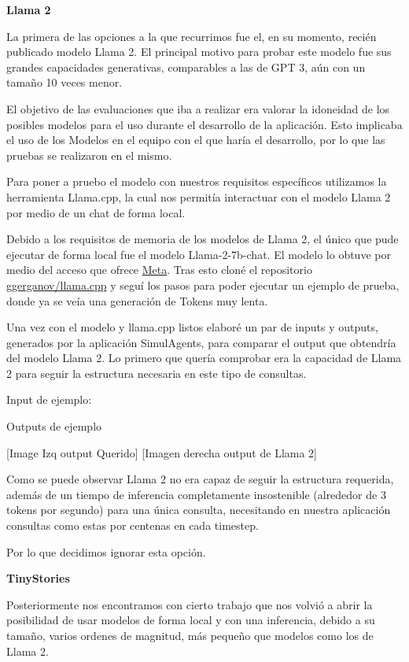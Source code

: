 \textbf{Llama 2}

La primera de las opciones a la que recurrimos fue el, en su momento, recién publicado modelo Llama 2. El principal motivo para probar este modelo fue sus grandes capacidades generativas, comparables a las de GPT 3, aún con un tamaño 10 veces menor.

El  objetivo de las evaluaciones que iba a realizar era valorar la idoneidad de los posibles modelos para el uso durante el desarrollo  de la aplicación. Esto implicaba el uso de los Modelos en el equipo con el que haría el desarrollo, por lo que las pruebas se realizaron en el mismo.

Para poner a pruebo el modelo con nuestros requisitos específicos utilizamos la herramienta Llama.cpp, la cual nos permitía interactuar con el modelo Llama 2 por medio de un chat de forma local.

Debido a los requisitos de memoria de los modelos de Llama 2, el único que pude ejecutar de forma local fue el modelo Llama-2-7b-chat. El modelo lo obtuve por medio del acceso que ofrece \href{https://llama.meta.com/llama-downloads/}{Meta}. Tras esto cloné el repositorio \href{https://github.com/ggerganov/llama.cpp}{ggerganov/llama.cpp} y seguí los pasos para poder ejecutar un ejemplo de prueba, donde ya se veía una generación de Tokens muy lenta.

Una vez con el modelo y llama.cpp listos elaboré un par de inputs y outputs, generados por la aplicación SimulAgents, para comparar el output que obtendría del modelo Llama 2. Lo primero que quería comprobar era la capacidad de Llama 2 para seguir la estructura necesaria en este tipo de consultas.

Input de ejemplo:

Outputs de ejemplo

[Image Izq output Querido] [Imagen derecha output de Llama 2]

Como se puede observar Llama 2 no era capaz de seguir la estructura requerida, además de un tiempo de inferencia completamente insostenible (alrededor de 3 tokens por segundo) para una única consulta, necesitando en nuestra aplicación consultas como estas por centenas en cada timestep.

Por lo que decidimos ignorar esta opción.

\textbf{TinyStories}

Posteriormente nos encontramos con cierto trabajo que nos volvió a abrir la posibilidad de usar modelos de forma local y con una inferencia, debido a su tamaño, varios ordenes de magnitud, más pequeño que modelos como los de Llama 2.

